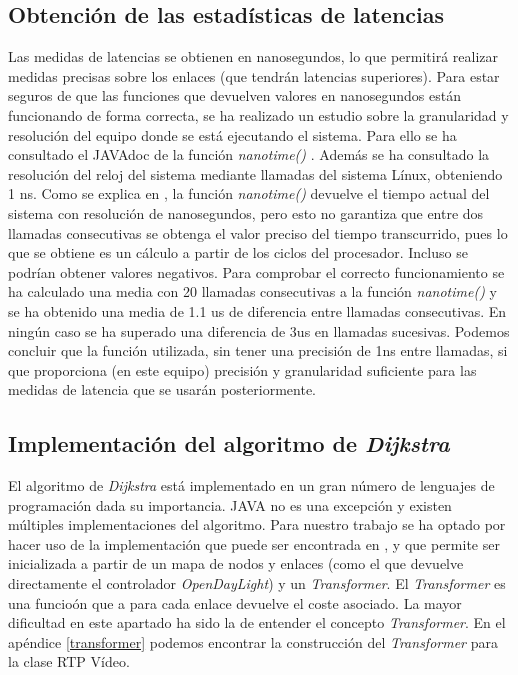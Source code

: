 \documentclass[a4paper,11pt]{book}
\begin{document}
\subsection{Obtención de las estadísticas de latencias}
 Las medidas de latencias se obtienen en nanosegundos, lo que permitirá realizar medidas precisas sobre los enlaces (que tendrán latencias superiores). Para estar seguros de que las funciones que devuelven valores en nanosegundos están funcionando de forma correcta, se ha realizado un estudio sobre la granularidad y resolución del equipo donde se está ejecutando el sistema. Para ello se ha consultado el JAVAdoc de la función \textit{nanotime()} \cite{nanotime}. Además se ha consultado la resolución del reloj del sistema mediante llamadas del sistema Línux, obteniendo 1 ns. 
Como se explica en \cite{nanotime}, la función \textit{nanotime()} devuelve el tiempo actual del sistema con resolución de nanosegundos, pero esto no garantiza que entre dos llamadas consecutivas se obtenga el valor preciso del tiempo transcurrido, pues lo que se obtiene es un cálculo a partir de los ciclos del procesador. Incluso se podrían obtener valores negativos. Para comprobar el correcto funcionamiento se ha calculado una media con 20 llamadas consecutivas a la función \textit{nanotime()} y se ha obtenido una media de 1.1 us de diferencia entre llamadas consecutivas. En ningún caso se ha superado una diferencia de 3us en llamadas sucesivas. Podemos concluir que la función utilizada, sin tener una precisión de 1ns entre llamadas, si que proporciona (en este equipo) precisión y granularidad suficiente para las medidas de latencia que se usarán posteriormente.

\subsection{Implementación del algoritmo de \textit{Dijkstra}}
El algoritmo de \textit{Dijkstra} está implementado en un gran número de lenguajes de programación dada su importancia. JAVA no es una excepción y existen múltiples implementaciones del algoritmo. Para nuestro trabajo se ha optado por hacer uso de la implementación que puede ser encontrada en \cite{dijkstraAPI}, y que permite ser inicializada a partir de un mapa de nodos y enlaces (como el que devuelve directamente el controlador \emph{OpenDayLight}) y un \textit{Transformer}. El \textit{Transformer} es una funcioón que a para cada enlace devuelve el coste asociado. La mayor dificultad en este apartado ha sido la de entender el concepto \textit{Transformer}. En el apéndice \ref{transformer} podemos encontrar la construcción del \textit{Transformer} para la clase \ac{RTP} Vídeo.
\end{document}
